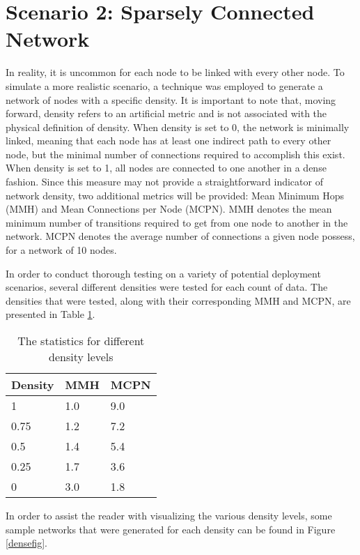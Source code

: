 \section{Scenario 2: Sparsely Connected Network}
In reality, it is uncommon for each node to be linked with every other node. To simulate a more realistic scenario, a technique was employed to generate a network of nodes with a specific density. It is important to note that, moving forward, density refers to an artificial metric and is not associated with the physical definition of density. When density is set to 0, the network is minimally linked, meaning that each node has at least one indirect path to every other node, but the minimal number of connections required to accomplish this exist. When density is set to 1, all nodes are connected to one another in a dense fashion. Since this measure may not provide a straightforward indicator of network density, two additional metrics will be provided:  Mean Minimum Hops (MMH) and Mean Connections per Node (MCPN). MMH denotes the mean minimum number of transitions required to get from one node to another in the network. MCPN denotes the average number of connections a given node possess, for a network of 10 nodes.

In order to conduct thorough testing on a variety of potential deployment scenarios, several different densities were tested for each count of data. The densities that were tested, along with their corresponding MMH and MCPN, are presented in Table \ref{sparsedensities}.

\begin{table}[H]
	\centering
	\begin{tabular}{l|l|l}
		Density & MMH & MCPN \\ \hline
		1 & 1.0 & 9.0 \\
		0.75    & 1.2 & 7.2  \\
		0.5    & 1.4 & 5.4  \\
		0.25    & 1.7 & 3.6  \\
		0    & 3.0 & 1.8  \\
	\end{tabular}
	\caption{The statistics for different density levels} \label{sparsedensities}
\end{table}

In order to assist the reader with visualizing the various density levels, some sample networks that were generated for each density can be found in Figure \ref{densefig}.

